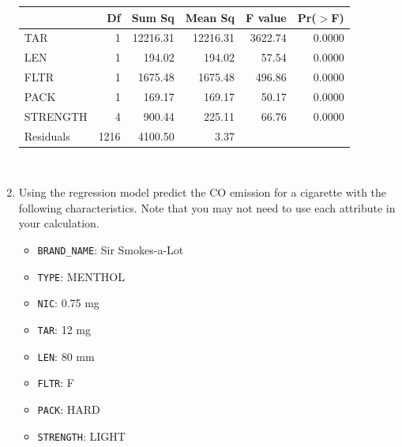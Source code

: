 \documentclass[11pt]{article}
\newcommand{\soln}[2]{$\:$\\ \vspace{#1}}{}
\begin{document}
\begin{enumerate}[resume]
\begin{minipage}[c]{0.55\textwidth}
{\footnotesize
\begin{tabular}{lrrrrr}
  \hline
 & Df & Sum Sq & Mean Sq & F value & Pr($>$F) \\ 
  \hline
TAR & 1 & 12216.31 & 12216.31 & 3622.74 & 0.0000 \\ 
  LEN & 1 & 194.02 & 194.02 & 57.54 & 0.0000 \\ 
  FLTR & 1 & 1675.48 & 1675.48 & 496.86 & 0.0000 \\ 
  PACK & 1 & 169.17 & 169.17 & 50.17 & 0.0000 \\ 
  STRENGTH & 4 & 900.44 & 225.11 & 66.76 & 0.0000 \\ 
  Residuals & 1216 & 4100.50 & 3.37 &  &  \\ 
   \hline
\end{tabular}
}
\end{minipage}
\begin{minipage}[c]{0.4\textwidth}
\soln{3cm}{
$R^2_{TAR}$ \\ 
$= \frac{12216.31}{12216.31 + 194.02 + 1675.48 + 169.17 + 900.44 + 4100.50}$ \\
$\approx 0.63$
}
\end{minipage}

%

\item Using the regression model predict the CO emission for a cigarette with the following characteristics. Note that you 
may not need to use each attribute in your calculation.

\begin{multicols}{2}
\begin{itemize}
\item \texttt{BRAND\_NAME}: Sir Smokes-a-Lot
\item \texttt{TYPE}: MENTHOL
\item \texttt{NIC}: 0.75 mg
\item \texttt{TAR}: 12 mg
\item \texttt{LEN}: 80 mm
\item \texttt{FLTR}: F
\item \texttt{PACK}: HARD
\item \texttt{STRENGTH}: LIGHT
\end{itemize}
\end{multicols}

\soln{1.5cm}{
$\widehat{CO} = -0.0586 + 0.7344 * 12 + 0.0267 * 80 + 1.9077 = 12.79$
}

%


\end{enumerate}
\end{document}
